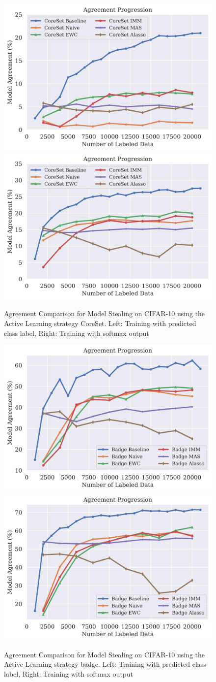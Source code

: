 \begin{figure}[!htb]
    \centering
    \includegraphics[width=0.48\linewidth]{images/results_CALMS/cifar100_label_coreset.png} \hfill
    \includegraphics[width=0.48\linewidth]{images/results_CALMS/cifar100_softmax_coreset.png}
    \caption{Agreement Comparison for Model Stealing on CIFAR-10 using the Active Learning strategy CoreSet. Left: Training with predicted class label,
    Right: Training with softmax output}
    \label{fig:CALMSCIFAR10CoreSet}
\end{figure}

\begin{figure}[!htb]
    \centering
    \includegraphics[width=0.48\linewidth]{images/results_CALMS/cifar_label_badge.png} \hfill
    \includegraphics[width=0.48\linewidth]{images/results_CALMS/cifar_softmax_badge.png}
    \caption{Agreement Comparison for Model Stealing on CIFAR-10 using the Active Learning strategy \gls{badge}. Left: Training with predicted class label,
    Right: Training with softmax output}
    \label{fig:CALMSCIFAR10Badge}
\end{figure}


